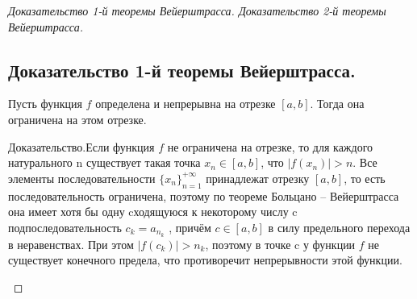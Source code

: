 
\label{sec_Proofs02}
\begin{proof}[Доказательство 1-й теоремы Вейерштрасса. Доказательство 2-й теоремы Вейерштрасса]
    \subsection*{Доказательство 1-й теоремы Вейерштрасса.}
    \begin{note}[amber]
        Пусть функция $f$ определена и непрерывна на отрезке $[a, b]$. Тогда она ограничена на этом отрезке. \\
        \begin{note}[purple]
            Доказательство.Если функция $f$ не ограничена на отрезке, то для каждого натурального n существует такая точка $x_n \in [a,b] $,
            что $|f(x_n)| > n$. Все элементы последовательности $\{x_n\}^{+\infty}_{n = 1}$ принадлежат отрезку
            $[a, b]$, то есть последовательность ограничена, поэтому по теореме Больцано – Вейерштрасса она имеет хотя бы одну cходящуюся к некоторому числу c
            подпоследовательность
            $c_k = a_{n_k}$ , причём $c \in[a, b]$ в силу предельного перехода в неравенствах. При этом
            $|f(c_k)| > n_k$, поэтому в точке c у функции $f$ не существует конечного предела, что противоречит непрерывности этой функции.
        \end{note}
    \end{note}


\end{proof}
